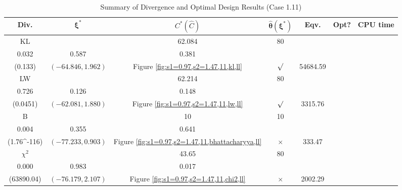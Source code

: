 \documentclass[12pt, a4paper]{article}
\begin{document}
\begin{table}[H]
\centering
\renewcommand{\arraystretch}{1.5} %
\setlength{\tabcolsep}{8pt} %
\begin{tabular}{|c|c|c|c|c|c|c|}
\hline
\textbf{Div.} & \(\boldsymbol{\xi^*}\) & \(C^* (\hat{C})\) & \(\boldsymbol{\hat{\theta}(\xi^*)}\) & \textbf{Eqv.} & \textbf{Opt?} & \textbf{CPU time} \\
\hline
KL & \(\left\{\begin{array}{ccc}
33.417 & 62.084 & 80 \\
0.032 & 0.587 & 0.381
\end{array}\right\}\) &
\(\begin{array}{c}
0.133 \\
(0.133)
\end{array}\) & 
\((-64.846, 1.962)\) & 
Figure \ref{fig:s1=0.97,s2=1.47,11,kl,ll} & $\surd$ & 54684.59 \\
\hline
LW & \(\left\{\begin{array}{ccc}
61.118 & 62.214 & 80 \\
0.726 & 0.126 & 0.148
\end{array}\right\}\) &
\(\begin{array}{c}
0.0475 \\
(0.0451)
\end{array}\) & 
\((-62.081, 1.880)\) & 
Figure \ref{fig:s1=0.97,s2=1.47,11,lw,ll} & $\surd$ & 3315.76 \\
\hline
B & \(\left\{\begin{array}{ccc}
10 & 10 & 10 \\
0.004 & 0.355 & 0.641
\end{array}\right\}\) &
\(\begin{array}{c}
1 \\
(1.76\times 10^{-116})
\end{array}\) & 
\((-77.233, 0.903)\) & 
Figure \ref{fig:s1=0.97,s2=1.47,11,bhattacharyya,ll} & $\times$ & 333.47 \\
\hline
\(\chi^2\) & \(\left\{\begin{array}{ccc}
10 & 43.65 & 80 \\
0.000 & 0.983 & 0.017
\end{array}\right\}\) &
\(\begin{array}{c}
12171.83 \\
(63890.04)
\end{array}\) & 
\((-76.179, 2.107)\) & 
Figure \ref{fig:s1=0.97,s2=1.47,11,chi2,ll} & $\times$ & 2002.29 \\
\hline
\end{tabular}
\caption{Summary of Divergence and Optimal Design Results (Case 1.11)}
\label{tab:results1.11}
\end{table}
\end{document}
